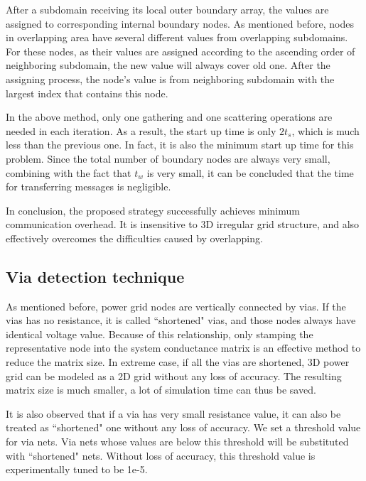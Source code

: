 \documentclass{sig-alternate}
\begin{document}
	After a subdomain receiving its local outer boundary array, the values are assigned to corresponding internal boundary 
	nodes. As 
	mentioned before, nodes in overlapping area have several different values from overlapping subdomains. For these nodes, 
	as their values are assigned according to the ascending order of neighboring subdomain, the new value will always cover old one. 
	After the assigning process, the node's value is from neighboring subdomain with the largest index that contains this node.  
	
	In the above method, only one gathering and one scattering operations are needed in each iteration. As a result, the start up time 
	is only $2t_s$, which is much less than the previous one. In fact, it is also the minimum 
	start up time for this problem. Since the total number 
	of boundary nodes are always very small, combining with the fact that $t_w$ is very small, it can be concluded that the 
	time for transferring messages is negligible. 

	In conclusion, the proposed strategy successfully achieves minimum communication overhead. It is insensitive to 3D irregular 
	grid structure, and also effectively overcomes the difficulties caused by overlapping.	
  \subsection{Via detection technique}
	As mentioned before, power grid nodes are vertically connected by vias. If the vias has no 
	resistance, it is called ``shortened" vias, and those nodes always have identical voltage value. Because of this relationship, 
	only stamping the representative
	node into the system conductance matrix is an effective method to reduce the matrix size. In extreme case, if all the
	vias are shortened, 3D power grid can be modeled as a 2D grid without any loss of accuracy. The resulting matrix size
	is much smaller, a lot of simulation time can thus be saved. 
 
	It is also observed that if a via has very small resistance value, it can also be treated as ``shortened" one 
	without any loss of accuracy. We set a threshold value for via nets. Via nets 
	whose values are below this threshold will be substituted with ``shortened" nets. Without loss of accuracy, this threshold value 
	is experimentally tuned to be 1e-5. 
\end{document}
